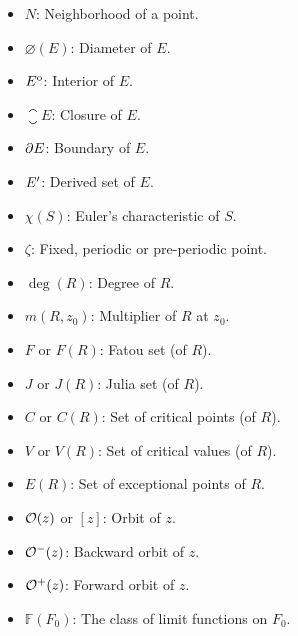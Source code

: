 {\vspace{2em}
\vspace{1em}
\begin{itemize}    
    \item $N$: Neighborhood of a point.
    \item $\diameter(E)$: Diameter of $E$.
    \item ${E}^{\mathrm{o}}$: Interior of $E$.
    \item $\closure{E}$: Closure of $E$.
    \item $\partial {E}$: Boundary of $E$.
    \item ${E}'$: Derived set of $E$.
    \item $\chi(S)$: Euler's characteristic of $S$.
\end{itemize}

\vspace{2em}
\vspace{1em}
\begin{itemize}
    \item $\zeta$: Fixed, periodic or pre-periodic point.
    \item $\deg(R)$: Degree of $R$.
    \item $m(R, z_0)$: Multiplier of $R$ at $z_0$.
    \item $F$ or $F(R)$: Fatou set (of $R$).
    \item $J$ or $J(R)$: Julia set (of $R$).
    \item $C$ or $C(R)$: Set of critical points (of $R$).
    \item $V$ or $V(R)$: Set of critical values (of $R$).
    \item $E(R)$: Set of exceptional points of $R$.
    \item $\mathcal{O}(z)$ or $[z]$: Orbit of $z$.
    \item $\mathcal{O}^-(z)$: Backward orbit of $z$.
    \item $\mathcal{O}^+(z)$: Forward orbit of $z$.
    \item $\mathbb{F}(F_0)$: The class of limit functions on $F_0$.
\end{itemize}
}


\printbibliography[heading=bibintoc]